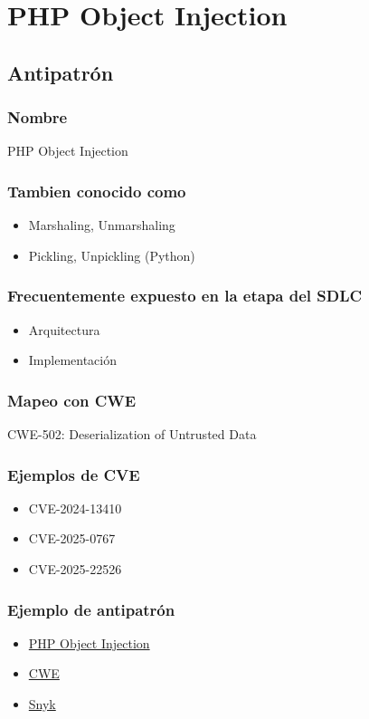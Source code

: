 \chapter{PHP Object Injection}
\section{Antipatrón}
\subsection{Nombre}
PHP Object Injection
\subsection{Tambien conocido como}
\begin{itemize}
    \item Marshaling, Unmarshaling
    \item Pickling, Unpickling (Python)
\end{itemize}
\subsection{Frecuentemente expuesto en la etapa del SDLC}
\begin{itemize}
    \item Arquitectura
    \item Implementación
\end{itemize}
\subsection{Mapeo con CWE}
CWE-502: Deserialization of Untrusted Data
\subsection{Ejemplos de CVE}
\begin{itemize}
    \item CVE-2024-13410
    \item CVE-2025-0767
    \item CVE-2025-22526
\end{itemize}

\subsection{Ejemplo de antipatrón}
\begin{itemize}
    \item \href{https://patchstack.com/academy/wordpress/vulnerabilities/php-object-injection/}{PHP Object Injection}
    \item \href{https://cwe.mitre.org/data/definitions/502.html}{CWE}
    \item \href{https://learn.snyk.io/lesson/object-injection/?ecosystem=php}{Snyk}
\end{itemize}
